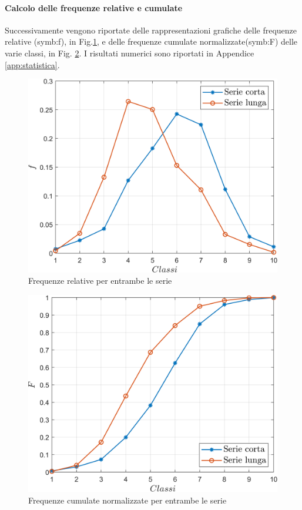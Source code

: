 \paragraph{Calcolo delle frequenze relative e cumulate}
Successivamente vengono riportate delle rappresentazioni grafiche 
delle frequenze relative (\gls{symb:f}), in Fig.\ref{fig:relboth}, e delle frequenze cumulate normalizzate(\gls{symb:F}) delle varie classi, in Fig. \ref{fig:cumboth}. I risultati numerici sono riportati in Appendice \ref{app:statistica}.



\begin{figure}
	\centering
	\includegraphics[width=0.7\linewidth]{"../sperimentazione nei propulsori/relboth"}
	\caption{Frequenze relative per entrambe le serie}
	\label{fig:relboth}
\end{figure}


\begin{figure}
	\centering
	\includegraphics[width=0.7\linewidth]{"../sperimentazione nei propulsori/cumboth"}
	\caption{Frequenze cumulate normalizzate per entrambe le serie}
	\label{fig:cumboth}
\end{figure}



